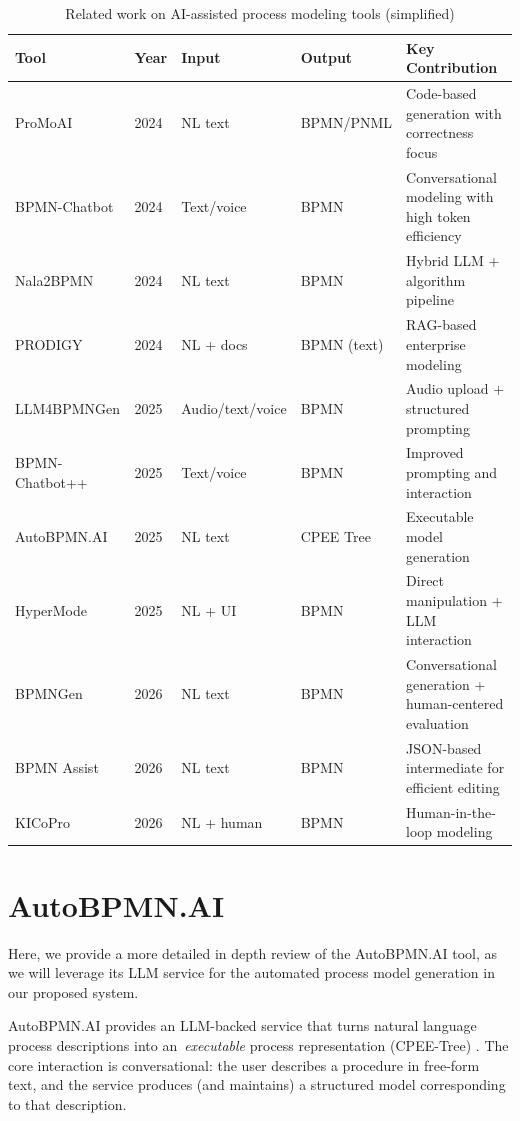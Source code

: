 \begin{table}[htb!]
\centering
\caption{Related work on AI-assisted process modeling tools (simplified)}
\begin{tabular}{p{2.5cm} l p{2cm} p{2cm} p{4cm}}
\hline
\textbf{Tool} & \textbf{Year} & \textbf{Input} & \textbf{Output} & \textbf{Key Contribution} \\
\hline

ProMoAI & 2024 
& NL text 
& BPMN/PNML
& Code-based generation with correctness focus \\
\hline
BPMN-Chatbot & 2024 
& Text/voice 
& BPMN
& Conversational modeling with high token efficiency \\
\hline
Nala2BPMN & 2024 
& NL text 
& BPMN
& Hybrid LLM + algorithm pipeline \\
\hline
PRODIGY & 2024 
& NL + docs 
& BPMN (text)
& RAG-based enterprise modeling \\
\hline
LLM4BPMNGen & 2025 
& Audio/text/voice
& BPMN
& Audio upload + structured prompting \\
\hline
BPMN-Chatbot++ & 2025 
& Text/voice 
& BPMN
& Improved prompting and interaction \\
\hline
AutoBPMN.AI & 2025 
& NL text 
& CPEE Tree
& Executable model generation \\
\hline
HyperMode & 2025 
& NL + UI 
& BPMN 
& Direct manipulation + LLM interaction \\
\hline
BPMNGen & 2026 
& NL text 
& BPMN
& Conversational generation + human-centered evaluation \\
\hline
BPMN Assist & 2026 
& NL text 
& BPMN
& JSON-based intermediate for efficient editing \\
\hline
KICoPro & 2026 
& NL + human 
& BPMN
& Human-in-the-loop modeling \\

\hline
\end{tabular}
\label{tab:lr}
\end{table}

\section{AutoBPMN.AI}
Here, we provide a more detailed in depth review of the AutoBPMN.AI tool, as we will leverage its LLM service for the automated process model generation in our proposed system.

AutoBPMN.AI provides an LLM-backed service that turns natural language process descriptions into an \,\emph{executable} process representation (CPEE-Tree) \cite{klievtsova2025autobpmn}. The core interaction is conversational: the user describes a procedure in free-form text, and the service produces (and maintains) a structured model corresponding to that description.

